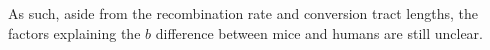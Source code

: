 As such, aside from the recombination rate and conversion tract lengths, the factors explaining the $b$ difference between mice and humans are still unclear.


%
%



